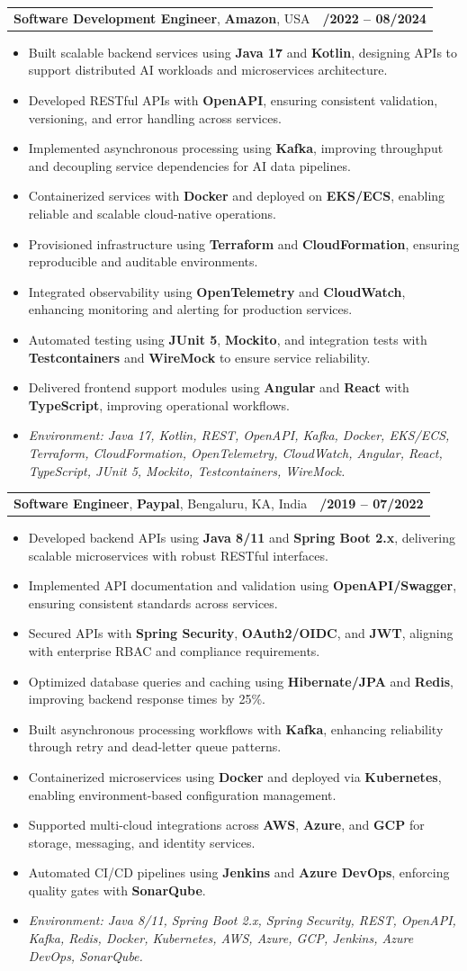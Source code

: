 \documentclass[letterpaper,11pt]{article}
\makeatletter
\newcommand{\resumeItem}[1]{
  \item\footnotesize{
    {#1 \vspace{-2pt}}
  }
}
\newcommand{\resumeSubheading}[4]{
  \vspace{-2pt}\item
    \begin{tabular*}{1.0\textwidth}[t]{l@{\extracolsep{\fill}}r}
      \textbf{\fontsize{10pt}{14pt}\selectfont #3}, \textbf{\fontsize{10pt}{14pt}\selectfont #1}, \fontsize{10pt}{14pt}\selectfont #4 & \textbf{\fontsize{10pt}{14pt}\selectfont #2} \\
    \end{tabular*}\vspace{-7pt}
}
\newcommand{\resumeItemListStart}{\begin{itemize}[leftmargin=*]}
\newcommand{\resumeItemListEnd}{\end{itemize}\vspace{-5pt}}
\makeatother
\begin{document}
\resumeSubheading
{Amazon}{10/2022 -- 08/2024}
{Software Development Engineer}{USA}
\resumeItemListStart
  \resumeItem{Built scalable backend services using \textbf{Java 17} and \textbf{Kotlin}, designing APIs to support distributed AI workloads and microservices architecture.}
  \resumeItem{Developed RESTful APIs with \textbf{OpenAPI}, ensuring consistent validation, versioning, and error handling across services.}
  \resumeItem{Implemented asynchronous processing using \textbf{Kafka}, improving throughput and decoupling service dependencies for AI data pipelines.}
  \resumeItem{Containerized services with \textbf{Docker} and deployed on \textbf{EKS/ECS}, enabling reliable and scalable cloud-native operations.}
  \resumeItem{Provisioned infrastructure using \textbf{Terraform} and \textbf{CloudFormation}, ensuring reproducible and auditable environments.}
  \resumeItem{Integrated observability using \textbf{OpenTelemetry} and \textbf{CloudWatch}, enhancing monitoring and alerting for production services.}
  \resumeItem{Automated testing using \textbf{JUnit 5}, \textbf{Mockito}, and integration tests with \textbf{Testcontainers} and \textbf{WireMock} to ensure service reliability.}
  \resumeItem{Delivered frontend support modules using \textbf{Angular} and \textbf{React} with \textbf{TypeScript}, improving operational workflows.}
  \resumeItem{\textit{Environment: Java 17, Kotlin, REST, OpenAPI, Kafka, Docker, EKS/ECS, Terraform, CloudFormation, OpenTelemetry, CloudWatch, Angular, React, TypeScript, JUnit 5, Mockito, Testcontainers, WireMock.}}
\resumeItemListEnd

\resumeSubheading
{Paypal}{08/2019 -- 07/2022}
{Software Engineer}{Bengaluru, KA, India}
\resumeItemListStart
  \resumeItem{Developed backend APIs using \textbf{Java 8/11} and \textbf{Spring Boot 2.x}, delivering scalable microservices with robust RESTful interfaces.}
  \resumeItem{Implemented API documentation and validation using \textbf{OpenAPI/Swagger}, ensuring consistent standards across services.}
  \resumeItem{Secured APIs with \textbf{Spring Security}, \textbf{OAuth2/OIDC}, and \textbf{JWT}, aligning with enterprise RBAC and compliance requirements.}
  \resumeItem{Optimized database queries and caching using \textbf{Hibernate/JPA} and \textbf{Redis}, improving backend response times by 25\%.}
  \resumeItem{Built asynchronous processing workflows with \textbf{Kafka}, enhancing reliability through retry and dead-letter queue patterns.}
  \resumeItem{Containerized microservices using \textbf{Docker} and deployed via \textbf{Kubernetes}, enabling environment-based configuration management.}
  \resumeItem{Supported multi-cloud integrations across \textbf{AWS}, \textbf{Azure}, and \textbf{GCP} for storage, messaging, and identity services.}
  \resumeItem{Automated CI/CD pipelines using \textbf{Jenkins} and \textbf{Azure DevOps}, enforcing quality gates with \textbf{SonarQube}.}
  \resumeItem{\textit{Environment: Java 8/11, Spring Boot 2.x, Spring Security, REST, OpenAPI, Kafka, Redis, Docker, Kubernetes, AWS, Azure, GCP, Jenkins, Azure DevOps, SonarQube.}}
\resumeItemListEnd
\end{document}
